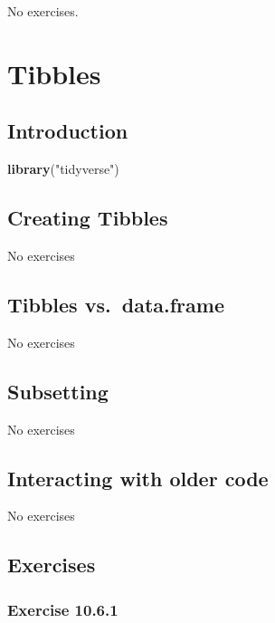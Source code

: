 \documentclass[]{book}
\newenvironment{Shaded}{\begin{snugshade}}{\end{snugshade}}
\newcommand{\KeywordTok}[1]{\textcolor[rgb]{0.13,0.29,0.53}{\textbf{#1}}}
\newcommand{\NormalTok}[1]{#1}
\newcommand{\StringTok}[1]{\textcolor[rgb]{0.31,0.60,0.02}{#1}}
\theoremstyle{plain}
\theoremstyle{remark}
\begin{document}
No exercises.

\hypertarget{tibbles}{%
\chapter{Tibbles}\label{tibbles}}

\hypertarget{introduction-5}{%
\section{Introduction}\label{introduction-5}}

\begin{Shaded}
\begin{Highlighting}[]
\KeywordTok{library}\NormalTok{(}\StringTok{"tidyverse"}\NormalTok{)}
\end{Highlighting}
\end{Shaded}

\hypertarget{creating-tibbles}{%
\section{Creating Tibbles}\label{creating-tibbles}}

No exercises

\hypertarget{tibbles-vs.data.frame}{%
\section{Tibbles vs.~data.frame}\label{tibbles-vs.data.frame}}

No exercises

\hypertarget{subsetting}{%
\section{Subsetting}\label{subsetting}}

No exercises

\hypertarget{interacting-with-older-code}{%
\section{Interacting with older
code}\label{interacting-with-older-code}}

No exercises

\hypertarget{exercises}{%
\section{Exercises}\label{exercises}}

\hypertarget{exercise-10.6.1}{%
\subsection*{\texorpdfstring{Exercise
{10.6.1}}{Exercise 10.6.1}}\label{exercise-10.6.1}}
\end{document}

